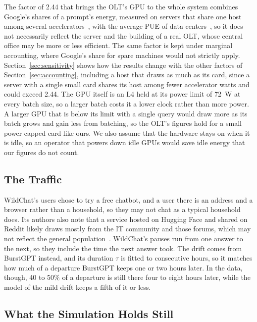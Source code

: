 \documentclass[cic,dipl,english]{infufrgs}
\begin{document}
The factor of 2.44 that brings the OLT's GPU to the whole system combines Google's shares of
a prompt's energy, measured on servers that share one host among several
accelerators~\cite{elsworth2025measuring}, with the average PUE of data
centers~\cite{uptime2025survey}, so it does not necessarily reflect the server and the
building of a real OLT, whose central office may be more or less efficient. The same factor
is kept under marginal accounting, where Google's share for spare machines would not
strictly apply. Section~\ref{sec:sensitivity} shows how the results change with the other
factors of Section~\ref{sec:accounting}, including a host that draws as much as its card, since
a server with a single small card shares its host among fewer accelerator watts and could exceed
2.44. The GPU itself
is an L4 held at its power limit of 72~W at every batch size, so a larger batch costs it a lower clock rather than more power. A larger GPU
that is below its limit with a single query would draw more as its batch grows and gain
less from batching, so the OLT's figures hold for a small power-capped card like ours. We also
assume that the hardware stays on when it is idle, so an operator that powers down idle GPUs
would save idle energy that our figures do not count.

\subsection{The Traffic}

WildChat's users chose to try a free chatbot, and a user there is an address and a browser
rather than a household, so they may not chat as a typical household does. Its authors also
note that a service hosted on Hugging Face and shared on Reddit likely draws mostly from the IT
community and those forums, which may not reflect the general population~\cite{zhao2024wildchat}.
WildChat's pauses run from one answer to the next, so they include the time the next answer
took. The drift comes from BurstGPT instead, and its duration $\tau$ is fitted to consecutive
hours, so it matches how much of a departure BurstGPT keeps one or two hours later. In the
data, though, 40 to 50\% of a departure is still there four to eight hours later, while the
model of the mild drift keeps a fifth of it or less.

\subsection{What the Simulation Holds Still}
\end{document}
